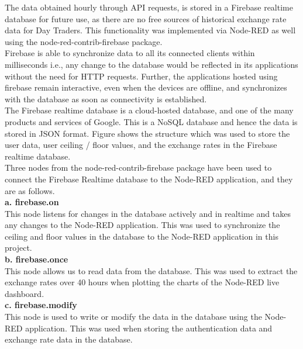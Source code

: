The data obtained hourly through API requests, is stored in a Firebase realtime database \cite{firebase} for future use, as there are no free sources of historical exchange rate data for Day Traders. This functionality was implemented via Node-RED as well using the node-red-contrib-firebase \cite{noderedfire} package.\\

Firebase is able to synchronize data to all its connected clients within milliseconds i.e., any change to the database would be reflected in its applications without the need for HTTP requests. Further, the applications hosted using firebase remain interactive, even when the devices are offline, and synchronizes with the database as soon as connectivity is established.\\

The Firebase realtime database is a cloud-hosted database, and one of the many products and services of Google. This is a NoSQL database and hence the data is stored in JSON format. Figure  shows the structure which was used to store the user data, user ceiling / floor values, and the exchange rates in the Firebase realtime database.\\

Three nodes from the node-red-contrib-firebase package have been used to connect the Firebase Realtime database to the Node-RED application, and they are as follows.\\

\textbf{a. firebase.on}\\

This node listens for changes in the database actively and in realtime and takes any changes to the Node-RED application. This was used to synchronize the ceiling and floor values in the database to the Node-RED application in this project.\\

\textbf{b. firebase.once} \\

This node allows us to read data from the database. This was used to extract the exchange rates over 40 hours when plotting the charts of the Node-RED live dashboard.\\

\textbf{c. firebase.modify}\\

This node is used to write or modify the data in the database using the Node-RED application. This was used when storing the authentication data and exchange rate data in the database.\\

